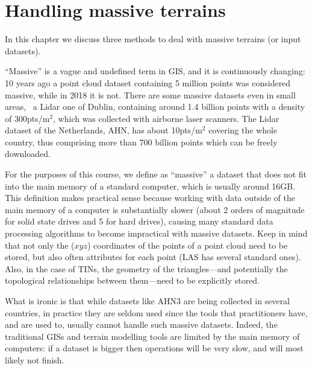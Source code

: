 
\setchapterpreamble[u]{\margintoc}

\chapter{Handling massive terrains}
\label{chap:massive}

\graphicspath{{massive/}}


In this chapter we discuss three methods to deal with massive terrains (or input datasets).

%

``Massive'' is a vague and undefined term in GIS, and it is continuously changing: 10 years ago a point cloud dataset containing 5 million points was considered massive, while in 2018 it is not.
There are some massive datasets even in small areas, \eg\ a Lidar one of Dublin, containing around 1.4 billion points with a density of 300pts/m$^2$, which was collected with airborne laser scanners.
The Lidar dataset of the Netherlands, AHN, has about 10pts/m$^2$ covering the whole country, thus comprising more than 700 billion points which can be freely downloaded.

%

For the purposes of this course, we define as ``massive'' a dataset that does not fit into the main memory of a standard computer, which is usually around 16GB\@.
This definition makes practical sense because working with data outside of the main memory of a computer is substantially slower (about 2 orders of magnitude for solid state drives and 5 for hard drives), causing many standard data processing algorithms to become impractical with massive datasets.
Keep in mind that not only the ($xyz$) coordinates of the points of a point cloud need to be stored, but also often attributes for each point (LAS has several standard ones).
Also, in the case of TINs, the geometry of the triangles---and potentially the topological relationships between them---need to be explicitly stored.

%

What is ironic is that while datasets like AHN3 are being collected in several countries, in practice they are seldom used since the tools that practitioners have, and are used to, usually cannot handle such massive datasets. 
Indeed, the traditional GISs and terrain modelling tools are limited by the main memory of computers: if a dataset is bigger then operations will be very slow, and will most likely not finish.




